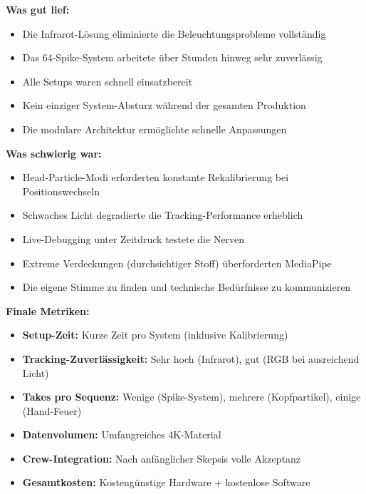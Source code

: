 \textbf{Was gut lief:}
\begin{itemize}
   \item Die Infrarot-Lösung eliminierte die Beleuchtungsprobleme vollständig
   \item Das 64-Spike-System arbeitete über Stunden hinweg sehr zuverlässig
   \item Alle Setups waren schnell einsatzbereit
   \item Kein einziger System-Absturz während der gesamten Produktion
   \item Die modulare Architektur ermöglichte schnelle Anpassungen
\end{itemize}

\textbf{Was schwierig war:}
\begin{itemize}
   \item Head-Particle-Modi erforderten konstante Rekalibrierung bei Positionswechseln
   \item Schwaches Licht degradierte die Tracking-Performance erheblich
   \item Live-Debugging unter Zeitdruck testete die Nerven
   \item Extreme Verdeckungen (durchsichtiger Stoff) überforderten MediaPipe
   \item Die eigene Stimme zu finden und technische Bedürfnisse zu kommunizieren
\end{itemize}

\textbf{Finale Metriken:}
\begin{itemize}
   \item \textbf{Setup-Zeit:} Kurze Zeit pro System (inklusive Kalibrierung)
   \item \textbf{Tracking-Zuverlässigkeit:} Sehr hoch (Infrarot), gut (RGB bei ausreichend Licht)
   \item \textbf{Takes pro Sequenz:} Wenige (Spike-System), mehrere (Kopfpartikel), einige (Hand-Feuer)
   \item \textbf{Datenvolumen:} Umfangreiches 4K-Material
   \item \textbf{Crew-Integration:} Nach anfänglicher Skepsis volle Akzeptanz
   \item \textbf{Gesamtkosten:} Kostengünstige Hardware + kostenlose Software
\end{itemize}